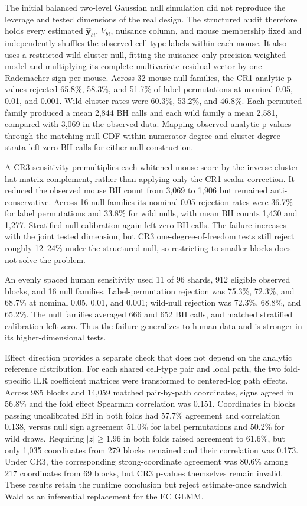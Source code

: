 \documentclass[11pt]{article}
\begin{document}
The initial balanced two-level Gaussian null simulation did not reproduce the leverage and tested dimensions of the real design. The structured audit therefore holds every estimated \(\widehat{\bm y}_{bi}\), \(V_{bi}\), nuisance column, and mouse membership fixed and independently shuffles the observed cell-type labels within each mouse. It also uses a restricted wild-cluster null, fitting the nuisance-only precision-weighted model and multiplying its complete multivariate residual vector by one Rademacher sign per mouse. Across 32 mouse null families, the CR1 analytic p-values rejected 65.8\%, 58.3\%, and 51.7\% of label permutations at nominal 0.05, 0.01, and 0.001. Wild-cluster rates were 60.3\%, 53.2\%, and 46.8\%. Each permuted family produced a mean 2,844 BH calls and each wild family a mean 2,581, compared with 3,069 in the observed data. Mapping observed analytic p-values through the matching null CDF within numerator-degree and cluster-degree strata left zero BH calls for either null construction.

A CR3 sensitivity premultiplies each whitened mouse score by the inverse cluster hat-matrix complement, rather than applying only the CR1 scalar correction. It reduced the observed mouse BH count from 3,069 to 1,906 but remained anti-conservative. Across 16 null families its nominal 0.05 rejection rates were 36.7\% for label permutations and 33.8\% for wild nulls, with mean BH counts 1,430 and 1,277. Stratified null calibration again left zero BH calls. The failure increases with the joint tested dimension, but CR3 one-degree-of-freedom tests still reject roughly 12--24\% under the structured null, so restricting to smaller blocks does not solve the problem.

An evenly spaced human sensitivity used 11 of 96 shards, 912 eligible observed blocks, and 16 null families. Label-permutation rejection was 75.3\%, 72.3\%, and 68.7\% at nominal 0.05, 0.01, and 0.001; wild-null rejection was 72.3\%, 68.8\%, and 65.2\%. The null families averaged 666 and 652 BH calls, and matched stratified calibration left zero. Thus the failure generalizes to human data and is stronger in its higher-dimensional tests.

Effect direction provides a separate check that does not depend on the analytic reference distribution. For each shared cell-type pair and local path, the two fold-specific ILR coefficient matrices were transformed to centered-log path effects. Across 985 blocks and 14,059 matched pair-by-path coordinates, signs agreed in 56.8\% and the fold effect Spearman correlation was 0.151. Coordinates in blocks passing uncalibrated BH in both folds had 57.7\% agreement and correlation 0.138, versus null sign agreement 51.0\% for label permutations and 50.2\% for wild draws. Requiring \(|z|\geq1.96\) in both folds raised agreement to 61.6\%, but only 1,035 coordinates from 279 blocks remained and their correlation was 0.173. Under CR3, the corresponding strong-coordinate agreement was 80.6\% among 217 coordinates from 69 blocks, but CR3 p-values themselves remain invalid. These results retain the runtime conclusion but reject estimate-once sandwich Wald as an inferential replacement for the EC GLMM.
\end{document}
